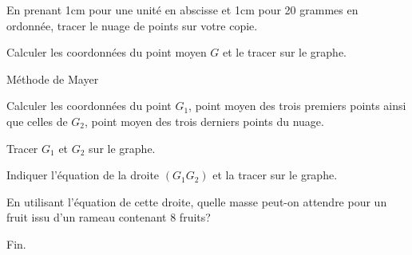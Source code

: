 \documentclass[a4paper,12pt]{scrartcl}
\begin{document}
\question{}
En prenant 1cm pour une unité en abscisse et 1cm pour 20 grammes en ordonnée, tracer le nuage de points sur votre copie.

\question{}
Calculer les coordonnées du point moyen $G$ et le tracer sur le graphe.

\question{}
Méthode de Mayer

\subquestion{}
Calculer les coordonnées du point $G_1$, point moyen des trois premiers points ainsi que celles de $G_2$, point moyen des trois derniers points du nuage. 

\subquestion{}
Tracer $G_1$ et $G_2$ sur le graphe.

\subquestion{}
Indiquer l'équation de la droite $(G_1 G_2)$ et la tracer sur le graphe. 

\subquestion{}
En utilisant l'équation de cette droite, quelle masse peut-on attendre pour un fruit issu d'un rameau contenant 8 fruits?

\trait

\begin{center}
Fin.
\end{center}
\end{document}
